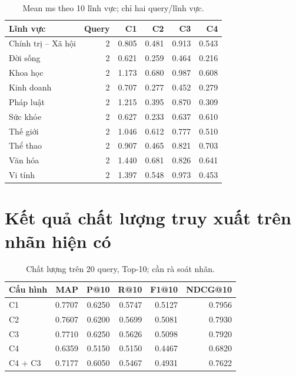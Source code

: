 \begin{table}[htbp]
\centering
\begin{tabular}{|l|r|r|r|r|r|}
\hline
Lĩnh vực & Query & C1 & C2 & C3 & C4 \\
\hline
Chính trị – Xã hội & 2 & 0.805 & 0.481 & 0.913 & 0.543 \\
Đời sống & 2 & 0.621 & 0.259 & 0.464 & 0.216 \\
Khoa học & 2 & 1.173 & 0.680 & 0.987 & 0.608 \\
Kinh doanh & 2 & 0.707 & 0.277 & 0.452 & 0.279 \\
Pháp luật & 2 & 1.215 & 0.395 & 0.870 & 0.309 \\
Sức khỏe & 2 & 0.627 & 0.233 & 0.637 & 0.610 \\
Thế giới & 2 & 1.046 & 0.612 & 0.777 & 0.510 \\
Thể thao & 2 & 0.907 & 0.465 & 0.821 & 0.703 \\
Văn hóa & 2 & 1.440 & 0.681 & 0.826 & 0.641 \\
Vi tính & 2 & 1.397 & 0.548 & 0.973 & 0.453 \\
\hline
\end{tabular}
\caption{Mean ms theo 10 lĩnh vực; chỉ hai query/lĩnh vực.}
\end{table}

\section{Kết quả chất lượng truy xuất trên nhãn hiện có}

\begin{table}[htbp]
\centering
\begin{tabular}{|l|r|r|r|r|r|}
\hline
Cấu hình & MAP & P@10 & R@10 & F1@10 & NDCG@10 \\
\hline
C1 & 0.7707 & 0.6250 & 0.5747 & 0.5127 & 0.7956 \\
C2 & 0.7607 & 0.6200 & 0.5699 & 0.5081 & 0.7930 \\
C3 & 0.7710 & 0.6250 & 0.5626 & 0.5098 & 0.7920 \\
C4 & 0.6359 & 0.5150 & 0.5150 & 0.4467 & 0.6820 \\
C4 + C3 & 0.7177 & 0.6050 & 0.5467 & 0.4931 & 0.7622 \\
\hline
\end{tabular}
\caption{Chất lượng trên 20 query, Top-10; cần rà soát nhãn.}
\end{table}

